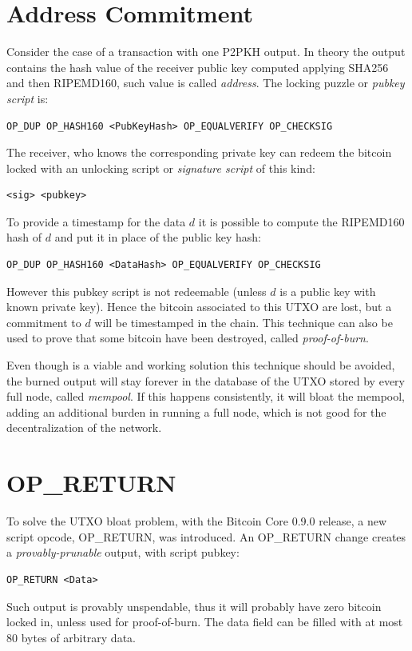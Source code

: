 \section{Address Commitment}
Consider the case of a transaction with one P2PKH output. In theory the output contains the hash value of the receiver public key computed applying SHA256 and then RIPEMD160, such value is called \textit{address}. The locking puzzle or \textit{pubkey script} is:
\begin{verbatim}
OP_DUP OP_HASH160 <PubKeyHash> OP_EQUALVERIFY OP_CHECKSIG
\end{verbatim}
The receiver, who knows the corresponding private key can redeem the bitcoin locked with an unlocking script or \textit{signature script} of this kind:
\begin{verbatim}
<sig> <pubkey>
\end{verbatim} 
To provide a timestamp for the data $d$ it is possible to compute the RIPEMD160 hash of $d$ and put it in place of the public key hash:
\begin{verbatim}
OP_DUP OP_HASH160 <DataHash> OP_EQUALVERIFY OP_CHECKSIG
\end{verbatim}
However this pubkey script is not redeemable (unless $d$ is a public key with known private key). Hence the bitcoin associated to this UTXO are lost, but a commitment to $d$ will be timestamped in the chain. 
This technique can also be used to prove that some bitcoin have been destroyed, called \textit{proof-of-burn}.

Even though is a viable and working solution this technique should be avoided, the burned output will stay forever in the database of the UTXO stored by every full node, called \textit{mempool}. If this happens consistently, it will bloat the mempool, adding an additional burden in running a full node, which is not good for the decentralization of the network.

\section{OP\_RETURN}
To solve the UTXO bloat problem, with the Bitcoin Core 0.9.0 release, a new script opcode, OP\_RETURN, was introduced. An OP\_RETURN change creates a \textit{provably-prunable} output, with script pubkey:
\begin{verbatim}
OP_RETURN <Data>
\end{verbatim}
Such output is provably unspendable, thus it will probably have zero bitcoin locked in, unless used for proof-of-burn. The data field can be filled with at most 80 bytes of arbitrary data. 

